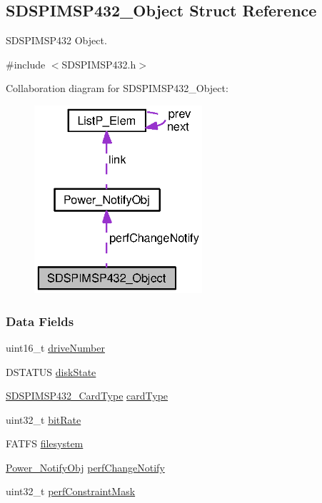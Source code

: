 \subsection{S\+D\+S\+P\+I\+M\+S\+P432\+\_\+\+Object Struct Reference}
\label{struct_s_d_s_p_i_m_s_p432___object}


S\+D\+S\+P\+I\+M\+S\+P432 Object.  




{\ttfamily \#include $<$S\+D\+S\+P\+I\+M\+S\+P432.\+h$>$}



Collaboration diagram for S\+D\+S\+P\+I\+M\+S\+P432\+\_\+\+Object\+:
\nopagebreak
\begin{figure}[H]
\begin{center}
\leavevmode
\includegraphics[width=176pt]{struct_s_d_s_p_i_m_s_p432___object__coll__graph}
\end{center}
\end{figure}
\subsubsection*{Data Fields}
\begin{DoxyCompactItemize}
\item 
uint16\+\_\+t \hyperlink{struct_s_d_s_p_i_m_s_p432___object_a8424c334651f7726e9c07833a5ef9cf6}{drive\+Number}
\item 
D\+S\+T\+A\+T\+U\+S \hyperlink{struct_s_d_s_p_i_m_s_p432___object_a8d288ffdb1286dcbefe68240845a622d}{disk\+State}
\item 
\hyperlink{_s_d_s_p_i_m_s_p432_8h_ac9da30e77207a761e49f62dac9ee8996}{S\+D\+S\+P\+I\+M\+S\+P432\+\_\+\+Card\+Type} \hyperlink{struct_s_d_s_p_i_m_s_p432___object_ac6ee11780aabde5cc87c349152c0cd35}{card\+Type}
\item 
uint32\+\_\+t \hyperlink{struct_s_d_s_p_i_m_s_p432___object_a32c5eab7964de4e2b746a67cfc334e2a}{bit\+Rate}
\item 
F\+A\+T\+F\+S \hyperlink{struct_s_d_s_p_i_m_s_p432___object_aa0bcb12572a581b36837f657a7c80b10}{filesystem}
\item 
\hyperlink{struct_power___notify_obj}{Power\+\_\+\+Notify\+Obj} \hyperlink{struct_s_d_s_p_i_m_s_p432___object_ac521ad7082e898a7cfe271a2cf3a7ddf}{perf\+Change\+Notify}
\item 
uint32\+\_\+t \hyperlink{struct_s_d_s_p_i_m_s_p432___object_a9028f4472eadf4c89003c35877d9ad18}{perf\+Constraint\+Mask}
\end{DoxyCompactItemize}


